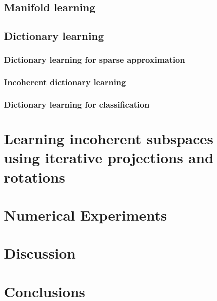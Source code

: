\documentclass[]{article}
\begin{document}
\subsection{Manifold learning}
\label{sec-2-2}
\subsection{Dictionary learning}
\label{sec-2-3}
\subsubsection{Dictionary learning for sparse approximation}
\label{sec-2-3-1}
\subsubsection{Incoherent dictionary learning}
\label{sec-2-3-2}
\subsubsection{Dictionary learning for classification}
\label{sec-2-3-3}

\section{Learning incoherent subspaces using iterative projections and rotations}
\label{sec-3}
\section{Numerical Experiments}
\label{sec-4}
\section{Discussion}
\label{sec-5}
\section{Conclusions}
\label{sec-6}



\end{document}
